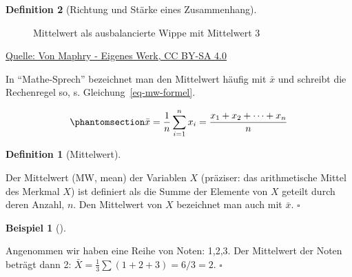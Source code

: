 \documentclass[
  a4paper,
  DIV=11]{scrreprt}
\theoremstyle{definition}
\theoremstyle{definition}
\newtheorem{example}{Beispiel}[chapter]
\theoremstyle{definition}
\newtheorem{definition}{Definition}[chapter]
\theoremstyle{remark}
\begin{document}
\begin{definition}[Richtung und Stärke eines
Zusammenhang]
\begin{figure}


\caption{\label{fig-wippe}Mittelwert als ausbalancierte Wippe mit
Mittelwert 3}

\end{figure}%

\href{https://commons.wikimedia.org/w/index.php?curid=79390659}{Quelle:
Von Maphry - Eigenes Werk, CC BY-SA 4.0}

In ``Mathe-Sprech'' bezeichnet man den Mittelwert häufig mit \(\bar{x}\)
und schreibt die Rechenregel so, s. Gleichung~\ref{eq-mw-formel}.

\begin{equation}\phantomsection\label{eq-mw-formel}{\bar {x} =\frac{1}{n} \sum_{i=1}^{n}{x_{i}}=\frac {x_{1}+x_{2}+\dotsb +x_{n}} {n}}\end{equation}

\begin{definition}[Mittelwert]\protect\hypertarget{def-mw}{}\label{def-mw}

Der Mittelwert (MW, mean) der Variablen \(X\) (präziser: das
arithmetische Mittel des Merkmal \(X\)) ist definiert als die Summe der
Elemente von \(X\) geteilt durch deren Anzahl, \(n\). Den Mittelwert von
\(X\) bezeichnet man auch mit \(\bar {x}\). \(\square\)

\end{definition}

\begin{example}[]\protect\hypertarget{exm-mw1}{}\label{exm-mw1}

Angenommen wir haben eine Reihe von Noten: 1,2,3. Der Mittelwert der
Noten beträgt dann 2: \(\bar{X} = \frac{1}{3}\sum (1+2+3) = 6/3 = 2\).
\(\square\)


\end{example}
\end{definition}
\end{document}
